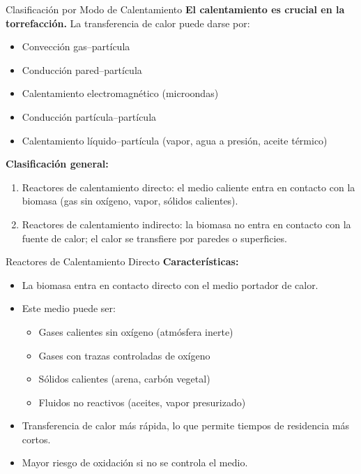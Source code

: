 \documentclass[main.tex]{subfiles}
\begin{document}
\begin{frame}{Clasificación por Modo de Calentamiento}
\small
\textbf{El calentamiento es crucial en la torrefacción.} La transferencia de calor puede darse por:
\begin{itemize}
  \item Convección gas–partícula
  \item Conducción pared–partícula
  \item Calentamiento electromagnético (microondas)
  \item Conducción partícula–partícula
  \item Calentamiento líquido–partícula (vapor, agua a presión, aceite térmico)
\end{itemize}

\textbf{Clasificación general:}
\begin{enumerate}
  \item \alert{Reactores de calentamiento directo:} el medio caliente entra en contacto con la biomasa (gas sin oxígeno, vapor, sólidos calientes).
  \item \alert{Reactores de calentamiento indirecto:} la biomasa no entra en contacto con la fuente de calor; el calor se transfiere por paredes o superficies.
\end{enumerate}

\end{frame}

\begin{frame}{Reactores de Calentamiento Directo}
\small
\textbf{Características:}
\begin{itemize}
  \item La biomasa entra en contacto directo con el medio portador de calor.
  \item Este medio puede ser:
    \begin{itemize}
      \item Gases calientes sin oxígeno (atmósfera inerte)
      \item Gases con trazas controladas de oxígeno
      \item Sólidos calientes (arena, carbón vegetal)
      \item Fluidos no reactivos (aceites, vapor presurizado)
    \end{itemize}
  \item Transferencia de calor más rápida, lo que permite tiempos de residencia más cortos.
  \item Mayor riesgo de oxidación si no se controla el medio.
\end{itemize}

\end{frame}
\end{document}
